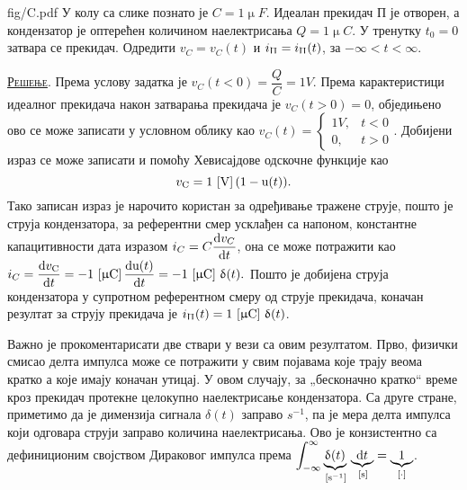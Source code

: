 \noindent
\begin{slikaDesno}[0.833]{fig/C.pdf}\noindent
\PID \label{ID:capID}
У колу са слике познато је 
$C = 1 \unit{\upmu F}$. 
Идеалан прекидач П је отворен, а кондензатор је оптерећен количином
наелектрисања $Q = 1 \unit{\upmu C}$. У тренутку $t_0 = 0$ затвара се прекидач. 
Одредити $v_{C} = v_{C}(t)$        
и $i_{\Uppi} = i_{\Uppi}(t)$, за $-\infty < t < \infty$. 
\end{slikaDesno}

\textsc{\underline{Решење}}.
Према услову задатка је 
\vspace{1mm}
$v_C(t < 0) = \dfrac{Q}{C} = 1\unit{V}$. Према карактеристици идеалног прекидача
након затварања прекидача је $v_C(t > 0) = 0$, обједињено ово се може записати у условном облику као 
$
v_C(t) = 
\begin{cases}
        1\unit{V},&  t < 0 \\
        0,        &  t > 0
\end{cases}.
$ Добијени израз се може записати и помоћу Хевисајдове одскочне функције као 
\begin{equation}
v_{\rm C} = 1\,\left[\mathrm{V}\right] ( 1 - {\rm u}(t) ). 
\end{equation}
Тако записан израз је нарочито користан за одређивање тражене струје, пошто је струја кондензатора, 
за референтни смер усклађен са напоном, 
константне капацитивности дата изразом $i_C = C\dfrac{{\rm d} v_C}{{\rm d} t}$, она се може потражити као
$
i_C = \dfrac{{\rm d} v_{\rm C}}{{\rm d} t} = - 1\,\left[\mathrm{\upmu C}\right] \dfrac{{\rm d} {\rm u}(t)}{{\rm d} t}  = 
- 1\,\left[\mathrm{\upmu C}\right] \, \updelta(t). 
$
Пошто је добијена струја кондензатора у супротном референтном смеру од струје прекидача, коначан 
резултат за струју прекидача је 
$i_{\Uppi}(t) = 1\,\left[\mathrm{\upmu C}\right] \, \updelta(t)$.

Важно је прокоментарисати две ствари у вези са овим резултатом. Прво, физички смисао делта импулса може
се потражити у свим појавама које трају веома кратко а које имају коначан утицај. У овом случају, 
за „бесконачно кратко“ време кроз прекидач протекне целокупно наелектрисање кондензатора. Са друге 
стране, приметимо да је димензија сигнала $\delta(t)$ заправо $\unit{s^{-1}}$, па је мера делта импулса
који одговара струји заправо количина наелектрисања. Ово је конзистентно са дефиниционим својством
Дираковог импулса према $\displaystyle \int_{-\infty}^{\infty} 
\underbrace{\updelta(t)}_{\,\left[\mathrm{s^{-1}}\right]} \, 
\underbrace{{\rm d} t}_{\,\left[\mathrm{s}\right]} = \underbrace{1}_{[\cdot]}$.